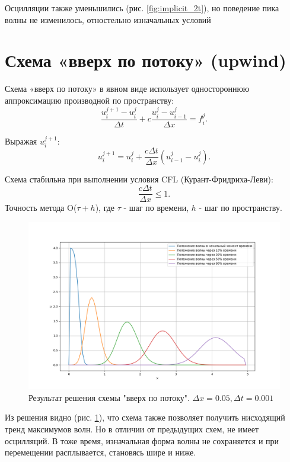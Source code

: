 Осцилляции также уменьшились (рис. \ref{fig:implicit_2t}), но поведение пика волны не изменилось, отностельно изначальных условий
\newpage

\section{Схема «вверх по потоку» (upwind)}

Схема «вверх по потоку» в явном виде использует одностороннюю аппроксимацию производной по пространству:
$$
	\frac{u_i^{j+1} - u_i^j}{\Delta t} + c\frac{u_i^j - u_{i-1}^j}{\Delta x} = f_{i}^j.
$$

Выражая $u_i^{j+1}$:
$$
	u_i^{j+1} = u_i^j + \frac{c \Delta t}{\Delta x} \left( u_{i-1}^j - u_i^j \right).
$$

Схема стабильна при выполнении условия CFL (Курант-Фридриха-Леви)\cite{Patankar1984}:
\begin{equation}
	\boxed{\frac{c \Delta t}{\Delta x} \leq 1}.
	\label{eq:ust2}
\end{equation}
Точность метода O($\tau + h$), где $\tau$ - шаг по времени, $h$ - шаг по пространству.
\begin{figure}[h]  %
	\centering
	\includegraphics[height=0.7\textwidth]{imgs/upwind.png}  %
	\caption{Результат решения  схемы "вверх по потоку". $\Delta x = 0.05 , \Delta t = 0.001$}  %
	\label{fig:upwind}  %
\end{figure}
\newline
 
Из решения видно (рис. \ref{fig:upwind}), что схема также позволяет получить нисходящий тренд максимумов волн.  Но в отличии от предыдущих схем, не имеет осцилляций. В тоже время, изначальная форма волны не сохраняется и при перемещении расплывается, становясь шире и ниже. 

